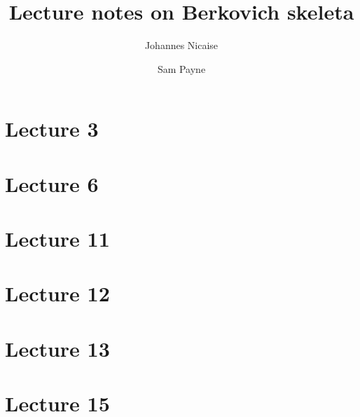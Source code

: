\documentclass[10pt,a4paper]{article}
\title{Lecture notes on Berkovich skeleta}
\author{Johannes Nicaise \and Sam Payne}
\numberwithin{equation}{section}
\begin{document}
\maketitle

\tableofcontents



\section{Lecture 3}


\section{Lecture 6}




\section{Lecture 11}
\section{Lecture 12}
\section{Lecture 13}

\section{Lecture 15}
\end{document}
